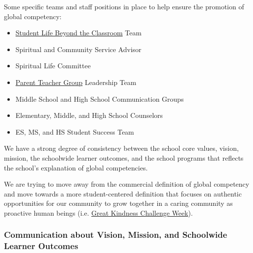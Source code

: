 \begin{findings}
Some specific teams and staff positions in place to help ensure the promotion of global competency:

\begin{itemize}
\item \href{http://blogs.cmis.ac.th/eagles/}{Student Life Beyond the Classroom} Team
\item Spiritual and Community Service Advisor
\item Spiritual Life Committee
\item \href{http://blogs.cmis.ac.th/ptg/about/}{Parent Teacher Group} Leadership Team
\item Middle School and High School Communication Groups
\item Elementary, Middle, and High School Counselors
\item ES, MS, and HS Student Success Team
\end{itemize}


We have a strong degree of consistency between the school core values, vision, mission, the schoolwide learner outcomes, and the school programs that reflects the school’s explanation of global competencies.

We are trying to move away from the commercial definition of global competency and move towards a more student-centered definition that focuses on authentic opportunities for our community to grow together in a caring community as proactive human beings (i.e. \href{https://drive.google.com/a/cmis.ac.th/file/d/0B0TYmzaZNi3fOF9RQkRqLV9saUE/view?usp=sharing}{Great Kindness Challenge Week}).
\end{findings}

\subsubsection{Communication about Vision, Mission, and Schoolwide Learner Outcomes}




